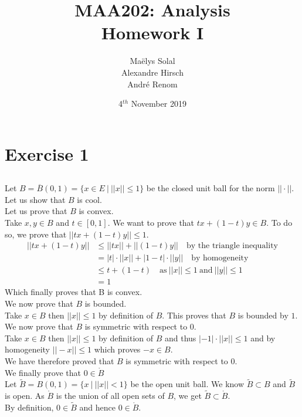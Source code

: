 \documentclass{article}
\title{MAA202: Analysis\\Homework I}
\date{4$^{th}$ November 2019}
\author{Ma\"elys Solal\\Alexandre Hirsch\\Andr\'e Renom}
\begin{document}
	\maketitle

	\newpage

\section{Exercise 1}
\subsection{}

Let $B = \overline{B}(0,1) = \{x \in E \ | \ ||x|| \leq 1\}$ be the closed unit ball for the norm $||\cdot||$. Let us show that $B$ is cool. \\

Let us prove that $B$ is convex. \\
Take $x, y \in B$ and $t \in [0, 1]$. We want to prove that $tx + (1-t)y \in B$. To do so, we prove that $||tx + (1-t)y|| \leq 1$. 
\begin{align*}
 	||tx + (1-t)y|| &\leq ||tx|| + ||(1-t)y|| \quad \text{by the triangle inequality} \\
	&= |t|\cdot ||x|| + |1-t|\cdot ||y|| \quad \text{by homogeneity} \\
	&\leq t + (1-t) \quad \text{as} \  ||x|| \leq 1 \  \text{and} \  ||y|| \leq 1 \\
	&= 1 
\end{align*}
Which finally proves that B is convex. \\

We now prove that $B$ is bounded. \\
Take $x \in B$ then $||x|| \leq 1$ by definition of $B$. This proves that $B$ is bounded by $1$. \\

We now prove that $B$ is symmetric with respect to $0$. \\
Take $x \in B$ then $||x|| \leq 1$ by definition of $B$ and thus $|-1|\cdot||x|| \leq 1$ and by homogeneity $||-x|| \leq 1$ which proves $-x \in B$. \\
We have therefore proved that $B$ is symmetric with respect to $0$. \\

We finally prove that $0 \in \mathring{B}$ \\
Let $\widetilde{B}=B(0,1) = \{x \ | \  ||x|| < 1 \}$ be the open unit ball. We know $\widetilde{B} \subset B$ and $\widetilde{B}$ is open. As $\mathring{B}$ is the union of all open sets of $B$, we get $\widetilde{B} \subset \mathring{B}$. \\
By definition, $0 \in \widetilde{B}$ and hence $0 \in \mathring{B}$. 
\end{document}
